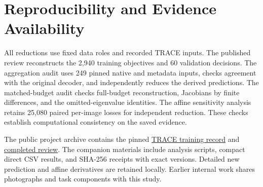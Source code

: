 \section{Reproducibility and Evidence Availability}\label{sec:repro}
All reductions use fixed data roles and recorded TRACE inputs. The published review reconstructs the 2,940 training objectives and 60 validation decisions. The aggregation audit uses 249 pinned native and metadata inputs, checks agreement with the original decoder, and independently reduces the derived predictions. The matched-budget audit checks full-budget reconstruction, Jacobians by finite differences, and the omitted-eigenvalue identities. The affine sensitivity analysis retains 25,080 paired per-image losses for independent reduction. These checks establish computational consistency on the saved evidence.

The public project archive contains the pinned \href{https://huggingface.co/datasets/Shanmuk4622/tyre-wear-study/tree/510cbc827337cbc963562c798811226326dc7c0c}{TRACE training record} and \href{https://huggingface.co/datasets/Shanmuk4622/tyre-wear-study/tree/7672729fdb1ccd0f55b565c1d60e8a50c6be078e}{completed review}. The companion materials include analysis scripts, compact direct CSV results, and SHA-256 receipts with exact versions. Detailed new prediction and affine derivatives are retained locally. Earlier internal work shares photographs and task components with this study.
